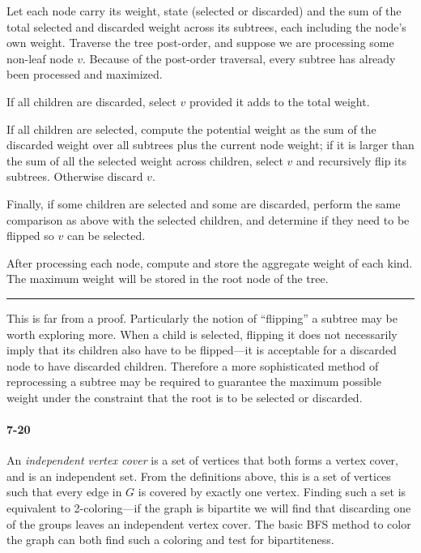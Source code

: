 \documentclass{report}
\newcommand{\underconstruction}{\marginpar{\bcpanchant}}
\newcommand{\okthen}{\rule[-1.4pt]{0.3em}{0.77em}}
\begin{document}
\smallskip

Let each node carry its weight, state (selected or discarded) and the sum of the total selected and discarded weight across its subtrees, each including the node's own weight. Traverse the tree post-order, and suppose we are processing some non-leaf node $v$. Because of the post-order traversal, every subtree has already been processed and maximized.

If all children are discarded, select $v$ provided it adds to the total weight.

If all children are selected, compute the potential weight as the sum of the discarded weight over all subtrees plus the current node weight; if it is larger than the sum of all the selected weight across children, select $v$ and recursively flip its subtrees. Otherwise discard $v$.

Finally, if some children are selected and some are discarded, perform the same comparison as above with the selected children, and determine if they need to be flipped so $v$ can be selected.

After processing each node, compute and store the aggregate weight of each kind. The maximum weight will be stored in the root node of the tree.\ \okthen

\smallskip

This is far from a proof. Particularly the notion of ``flipping'' a subtree may be worth exploring more. When a child is selected, flipping it does not necessarily imply that its children also have to be flipped---it is acceptable for a discarded node to have discarded children. Therefore a more sophisticated method of reprocessing a subtree may be required to guarantee the maximum possible weight under the constraint that the root is to be selected or discarded.\underconstruction

\paragraph{7-20} An \emph{independent vertex cover} is a set of vertices that both forms a vertex cover, and is an independent set. From the definitions above, this is a set of vertices such that every edge in $G$ is covered by exactly one vertex. Finding such a set is equivalent to 2-coloring---if the graph is bipartite we will find that discarding one of the groups leaves an independent vertex cover. The basic BFS method to color the graph can both find such a coloring and test for bipartiteness.
\end{document}
